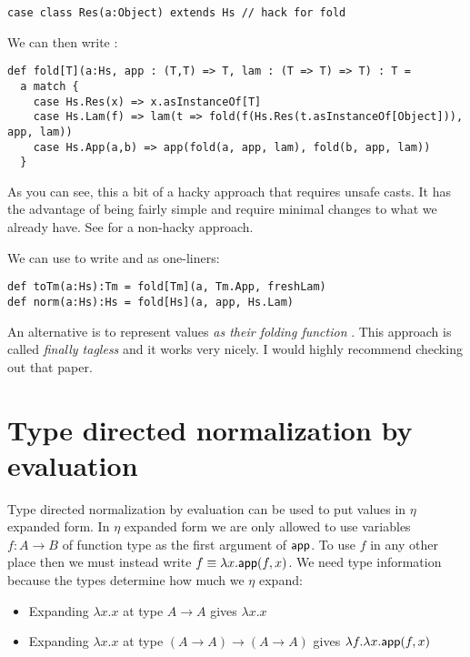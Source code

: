 \begin{lstlisting}
case class Res(a:Object) extends Hs // hack for fold
\end{lstlisting}

We can then write :

\begin{lstlisting}
def fold[T](a:Hs, app : (T,T) => T, lam : (T => T) => T) : T =
  a match {
    case Hs.Res(x) => x.asInstanceOf[T]
    case Hs.Lam(f) => lam(t => fold(f(Hs.Res(t.asInstanceOf[Object])), app, lam))
    case Hs.App(a,b) => app(fold(a, app, lam), fold(b, app, lam))
  }
\end{lstlisting}

As you can see, this a bit of a hacky approach that requires unsafe casts.
It has the advantage of being fairly simple and require minimal changes to what we already have.
See \cite{BoxesGoBananas2003} for a non-hacky approach.

We can use  to write  and  as one-liners:

\begin{lstlisting}
def toTm(a:Hs):Tm = fold[Tm](a, Tm.App, freshLam)
def norm(a:Hs):Hs = fold[Hs](a, app, Hs.Lam)
\end{lstlisting}

An alternative is to represent  values \emph{as their folding function} .
This approach is called \emph{finally tagless} \cite{FinallyTagless2007} and it works very nicely.
I would highly recommend checking out that paper.

\section{Type directed normalization by evaluation}

Type directed normalization by evaluation can be used to put values in $\eta$ expanded form.
In $\eta$ expanded form we are only allowed to use variables $f : A \to B$ of function type as the first argument of $\mathsf{app}$.
To use $f$ in any other place then we must instead write $f \equiv \lambda x. \mathsf{app}(f,x)$.
We need type information because the types determine how much we $\eta$ expand:
\begin{itemize}
  \item Expanding $\lambda x. x$ at type $A \to A$ gives $\lambda x. x$
  \item Expanding $\lambda x. x$ at type $(A \to A) \to (A \to A)$ gives $\lambda f. \lambda x. \mathsf{app}(f,x)$
\end{itemize}


